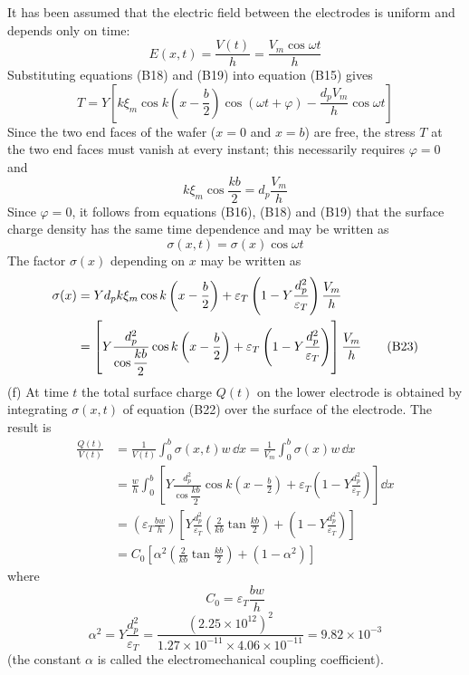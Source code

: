 It has been assumed that the electric field between the electrodes is uniform and depends only on time:
\begin{equation}
E(x,t)=\frac{V(t)}{h}=\frac{V_m\cos\omega t}{h} \tag{B19}
\end{equation}
Substituting equations (B18) and (B19) into equation (B15) gives
\begin{equation}
T=Y\left[k\xi_m\cos k\left(x-\frac{b}{2}\right)\cos(\omega t+\varphi)-\frac{d_pV_m}{h}\cos\omega t\right] \tag{B20}
\end{equation}
Since the two end faces of the wafer ($x=0$ and $x=b$) are free, the stress $T$ at the two end faces must vanish at every instant; this necessarily requires $\varphi=0$ and
\begin{equation}
k\xi_m\cos\frac{kb}{2}=d_p\frac{V_m}{h} \tag{B21}
\end{equation}
Since $\varphi=0$, it follows from equations (B16), (B18) and (B19) that the surface charge density has the same time dependence and may be written as
\begin{equation}
\sigma(x,t)=\sigma(x)\cos\omega t \tag{B22}
\end{equation}
The factor $\sigma(x)$ depending on $x$ may be written as
\begin{align}
\sigma(x) &= Yd_pk\xi_m\cos k\left(x-\frac{b}{2}\right)+\varepsilon_T\left(1-Y\frac{d_p^2}{\varepsilon_T}\right)\frac{V_m}{h}\notag\\
&= \left[Y\frac{d_p^2}{\cos\dfrac{kb}{2}}\cos k\left(x-\frac{b}{2}\right)+\varepsilon_T\left(1-Y\frac{d_p^2}{\varepsilon_T}\right)\right]\frac{V_m}{h} \tag{B23}
\end{align}
(f) At time $t$ the total surface charge $Q(t)$ on the lower electrode is obtained by integrating $\sigma(x,t)$ of equation (B22) over the surface of the electrode. The result is
\begin{align*}
\frac{Q(t)}{V(t)} &= \frac{1}{V(t)}\int_0^b\sigma(x,t)w\,\dd x=\frac{1}{V_m}\int_0^b\sigma(x)w\,\dd x\\
&= \frac{w}{h}\int_0^b\left[Y\frac{d_p^2}{\cos\dfrac{kb}{2}}\cos k\left(x-\frac{b}{2}\right)+\varepsilon_T\left(1-Y\frac{d_p^2}{\varepsilon_T}\right)\right]\dd x\\
&= \left(\varepsilon_T\frac{bw}{h}\right)\left[Y\frac{d_p^2}{\varepsilon_T}\left(\frac{2}{kb}\tan\frac{kb}{2}\right)+\left(1-Y\frac{d_p^2}{\varepsilon_T}\right)\right]\\
&= C_0\left[\alpha^2\left(\frac{2}{kb}\tan\frac{kb}{2}\right)+(1-\alpha^2)\right]
\end{align*}
where
\begin{equation*}
C_0=\varepsilon_T\frac{bw}{h}
\end{equation*}
\begin{equation}
\alpha^2=Y\frac{d_p^2}{\varepsilon_T}=\frac{(2.25\times10^{12})^2}{1.27\times10^{-11}\times4.06\times10^{-11}}=9.82\times10^{-3} \tag{B25}
\end{equation}
(the constant $\alpha$ is called the electromechanical coupling coefficient).

